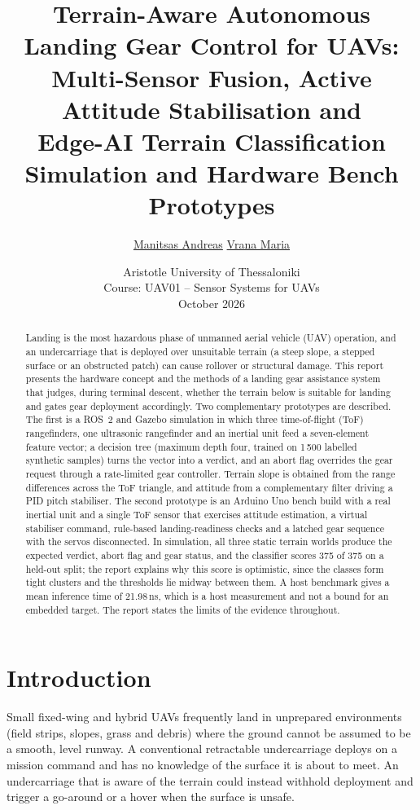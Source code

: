 \documentclass[11pt,a4paper]{article}
\title{Terrain-Aware Autonomous Landing Gear Control for UAVs:\\
Multi-Sensor Fusion, Active Attitude Stabilisation and\\
Edge-AI Terrain Classification\\[6pt]
\large Simulation and Hardware Bench Prototypes}
\author{\href{mailto:amanitsb@ece.auth.gr}{Manitsas Andreas} \:\: \href{mailto:mvranaa@ece.auth.gr}{Vrana Maria}}
\date{Aristotle University of Thessaloniki\\
Course: UAV01 -- Sensor Systems for UAVs\\[4pt]
October 2026}
\begin{document}
\maketitle
 
\begin{abstract}
\noindent
Landing is the most hazardous phase of unmanned aerial vehicle (UAV) operation, and an undercarriage that is deployed over unsuitable terrain (a steep slope, a stepped surface or an obstructed patch) can cause rollover or structural damage. This report presents the hardware concept and the methods of a landing gear assistance system that judges, during terminal descent, whether the terrain below is suitable for landing and gates gear deployment accordingly. Two complementary prototypes are described. The first is a ROS~2 and Gazebo simulation in which three time-of-flight (ToF) rangefinders, one ultrasonic rangefinder and an inertial unit feed a seven-element feature vector; a decision tree (maximum depth four, trained on 1\,500 labelled synthetic samples) turns the vector into a verdict, and an abort flag overrides the gear request through a rate-limited gear controller. Terrain slope is obtained from the range differences across the ToF triangle, and attitude from a complementary filter driving a PID pitch stabiliser. The second prototype is an Arduino Uno bench build with a real inertial unit and a single ToF sensor that exercises attitude estimation, a virtual stabiliser command, rule-based landing-readiness checks and a latched gear sequence with the servos disconnected. In simulation, all three static terrain worlds produce the expected verdict, abort flag and gear status, and the classifier scores 375 of 375 on a held-out split; the report explains why this score is optimistic, since the classes form tight clusters and the thresholds lie midway between them. A host benchmark gives a mean inference time of 21.98\,ns, which is a host measurement and not a bound for an embedded target. The report states the limits of the evidence throughout.
\end{abstract}

 
\tableofcontents
\bigskip
 
\section{Introduction}\label{sec:intro}
Small fixed-wing and hybrid UAVs frequently land in unprepared environments (field strips, slopes, grass and debris) where the ground cannot be assumed to be a smooth, level runway. A conventional retractable undercarriage deploys on a mission command and has no knowledge of the surface it is about to meet. An undercarriage that is aware of the terrain could instead withhold deployment and trigger a go-around or a hover when the surface is unsafe.
 
\end{document}
